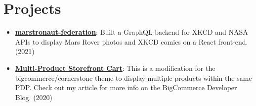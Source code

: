 \documentclass[letterpaper,10.8pt]{article}
\newcommand{\resumeItem}[2]{
  \item\small{
    \textbf{#1}{: #2 \vspace{-2pt}}
  }
}
\newcommand{\resumeSubItem}[2]{\resumeItem{#1}{#2}\vspace{-5pt}}
\newcommand{\resumeSubHeadingListStart}{\begin{itemize}[leftmargin=*]}
\newcommand{\resumeSubHeadingListEnd}{\end{itemize}}
\begin{document}
\section{Projects}
\resumeSubHeadingListStart
\resumeSubItem{\href{https:/kosenkor.in/}{marstronaut-federation}}{Built a GraphQL-backend for XKCD and NASA APIs to display Mars Rover photos and XKCD comics on a React front-end. (2021)}
\resumeSubItem{\href{https://github.com/obrien-k/multi-sf-cart}{Multi-Product Storefront Cart}}{This is a modification for the bigcommerce/cornerstone theme to display multiple products within the same PDP. Check out my article for more info on the BigCommerce Developer Blog. (2020)}
\vspace{5px}
\resumeSubHeadingListEnd

\end{document}

